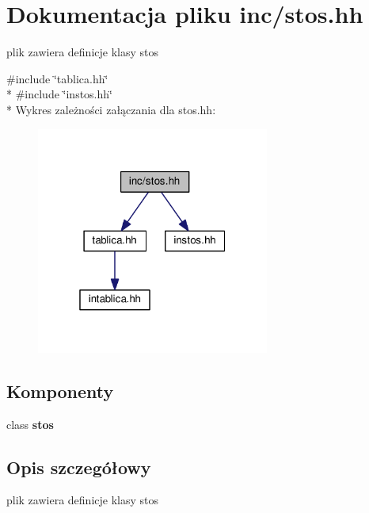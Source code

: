 \section{Dokumentacja pliku inc/stos.hh}
\label{stos_8hh}


plik zawiera definicje klasy stos  


{\ttfamily \#include \char`\"{}tablica.\+hh\char`\"{}}\\*
{\ttfamily \#include \char`\"{}instos.\+hh\char`\"{}}\\*
Wykres zależności załączania dla stos.\+hh\+:
\nopagebreak
\begin{figure}[H]
\begin{center}
\leavevmode
\includegraphics[width=217pt]{stos_8hh__incl}
\end{center}
\end{figure}
\subsection*{Komponenty}
\begin{DoxyCompactItemize}
\item 
class {\bf stos}
\end{DoxyCompactItemize}


\subsection{Opis szczegółowy}
plik zawiera definicje klasy stos 

